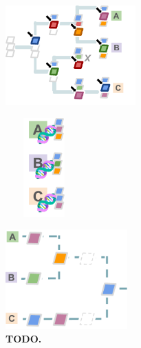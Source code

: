 \begin{figure}

\centering
\begin{minipage}{0.75\textwidth}

\begin{minipage}{0.4\linewidth}
\centering
\includegraphics[height=1.5in]{img/hstratschematic-evolve}
\end{minipage}%
\centering
\begin{minipage}{0.2\linewidth}
~~~
\includegraphics[height=1.5in]{img/hstratschematic-sample}
\end{minipage}%
\begin{minipage}{0.4\linewidth}
\centering
\includegraphics[height=1.5in]{img/hstratschematic-reconstruct}
\end{minipage}
\end{minipage}%
\begin{minipage}{0.25\textwidth}
\caption{\textbf{TODO.}}
\label{fig:hstratschematic}
\end{minipage}

\end{figure}